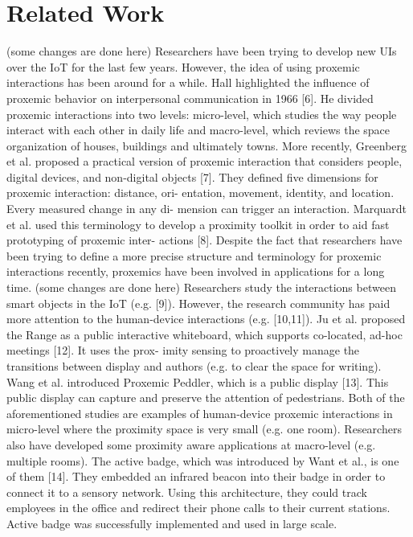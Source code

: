 \documentclass[runningheads,a4paper]{llncs}
\begin{document}
\section{Related Work }
(some changes are done here)
Researchers have been trying to develop new UIs over the IoT for the last few years. However, the idea of using proxemic interactions has been around for a while. Hall highlighted the influence of proxemic behavior on interpersonal communication in 1966 [6]. He divided proxemic interactions into two levels: micro-level, which studies the way people interact with each other in daily life and macro-level, which reviews the space organization of houses, buildings and ultimately towns. More recently, Greenberg et al. proposed a practical version of proxemic interaction that considers people, digital devices, and non-digital objects [7]. They defined five dimensions for proxemic interaction: distance, ori- entation, movement, identity, and location. Every measured change in any di- mension can trigger an interaction. Marquardt et al. used this terminology to develop a proximity toolkit in order to aid fast prototyping of proxemic inter- actions [8]. Despite the fact that researchers have been trying to define a more precise structure and terminology for proxemic interactions recently, proxemics have been involved in applications for a long time. 
\newline
\newpage
(some changes are done here)
Researchers study the interactions between smart objects in the IoT (e.g. [9]). However, the research community has paid more attention to the human-device interactions (e.g. [10,11]). Ju et al. proposed the Range as a public interactive whiteboard, which supports co-located, ad-hoc meetings [12]. It uses the prox- imity sensing to proactively manage the transitions between display and authors (e.g. to clear the space for writing). Wang et al. introduced Proxemic Peddler, which is a public display [13]. This public display can capture and preserve the attention of pedestrians. Both of the aforementioned studies are examples of human-device proxemic interactions in micro-level where the proximity space is very small (e.g. one room). Researchers also have developed some proximity aware applications at macro-level (e.g. multiple rooms). The active badge, which was introduced by Want et al., is one of them [14]. They embedded an infrared beacon into their badge in order to connect it to a sensory network. Using this architecture, they could track employees in the office and redirect their phone calls to their current stations. Active badge was successfully implemented and used in large scale. 
\end{document}
